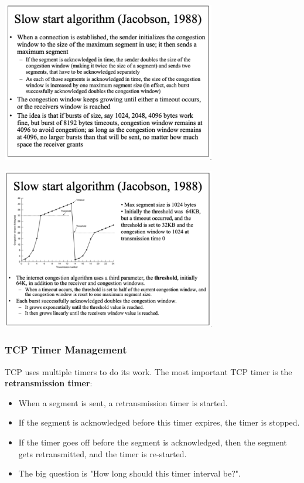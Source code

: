 \documentclass[11pt]{article}
\begin{document}
\begin{center}
    \includegraphics[width=0.7\textwidth]{slowstartalgorithm.png}
\end{center}
\begin{center}
    \includegraphics[width=0.7\textwidth]{slowstartalgorithm1.png}
\end{center}

\subsubsection{TCP Timer Management}
TCP uses multiple timers to do its work. 
The most important TCP timer is the \textbf{retransmission timer}:
\begin{itemize}
    \item   When a segment is sent, a retransmission timer is started.
    \item   If the segment is acknowledged before this timer expires, the timer is stopped. 
    \item   If the timer goes off before the segment is acknowledged, then the segment gets retransmitted, and the timer is re-started.
    \item   The big question is "How long should this timer interval be?".
\end{itemize}
\end{document}
